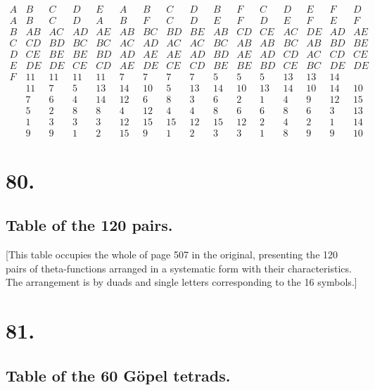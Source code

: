 \documentclass[11pt,a4paper]{book}
\begin{document}
\[
\begin{array}{cccccccccccccccc}
A & B & C & D & E & A & B & C & D & B & F & C & D & E & F & D \\
\hline
A & B & C & D & A & B & F & C & D & E & F & D & E & F & E & F \\
B & AB & AC & AD & AE & AB & BC & BD & BE & AB & CD & CE & AC & DE & AD & AE \\
C & CD & BD & BC & BC & AC & AD & AC & AC & BC & AB & AB & BC & AB & BD & BE \\
D & CE & BE & BE & BD & AD & AE & AE & AD & BD & AE & AD & CD & AC & CD & CE \\
E & DE & DE & CE & CD & AE & DE & CE & CD & BE & BE & BD & CE & BC & DE & DE \\
F & 11 & 11 & 11 & 11 & 7 & 7 & 7 & 7 & 5 & 5 & 5 & 13 & 13 & 14 \\
& 11 & 7 & 5 & 13 & 14 & 10 & 5 & 13 & 14 & 10 & 13 & 14 & 10 & 14 & 10 \\
& 7 & 6 & 4 & 14 & 12 & 6 & 8 & 3 & 6 & 2 & 1 & 4 & 9 & 12 & 15 \\
& 5 & 2 & 8 & 8 & 4 & 12 & 4 & 4 & 8 & 6 & 6 & 8 & 6 & 3 & 13 \\
& 1 & 3 & 3 & 3 & 12 & 15 & 15 & 12 & 15 & 12 & 2 & 4 & 2 & 1 & 14 \\
& 9 & 9 & 1 & 2 & 15 & 9 & 1 & 2 & 3 & 3 & 1 & 8 & 9 & 9 & 10
\end{array}
\]

\newpage
\section*{80.}
\label{sec:80}

\subsection*{Table of the 120 pairs.}

[This table occupies the whole of page 507 in the original, presenting the 120 pairs of theta-functions arranged in a systematic form with their characteristics. The arrangement is by duads and single letters corresponding to the 16 symbols.]

\newpage
\section*{81.}
\label{sec:81}

\subsection*{Table of the 60 G\"{o}pel tetrads.}
\end{document}
